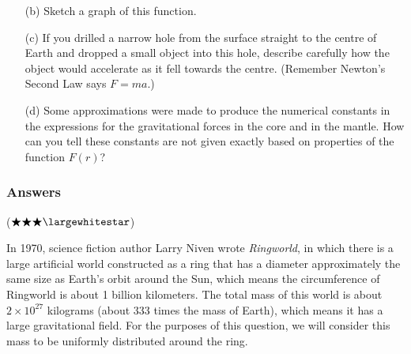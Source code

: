 \documentclass{exam}
\begin{document}
\begin{questions}
\begin{enumerate}
\item[(b)] Sketch a graph of this function.

\item[(c)] If you drilled a narrow hole from the surface straight to the centre of Earth and dropped a small object into this hole, describe carefully how the object would accelerate as it fell towards the centre. (Remember Newton's Second Law says $F=ma$.)

\item[(d)] Some approximations were made to produce the numerical constants in the expressions for the gravitational forces in the core and in the mantle. How can you tell these constants are not given exactly based on properties of the function $F(r)$?

\end{enumerate}

\color{blue}
\subsubsection*{Answers}
\color{black}

\question ($\bigstar \bigstar \bigstar \largewhitestar$) 

In 1970, science fiction author Larry Niven wrote \textit{Ringworld}, in which there is a large artificial world constructed as a ring that has a diameter approximately the same size as Earth's orbit around the Sun, which means the circumference of Ringworld is about 1 billion kilometers. The total mass of this world is about $2 \times 10^{27}$ kilograms (about 333 times the mass of Earth), which means it has a large gravitational field. For the purposes of this question, we will consider this mass to be uniformly distributed around the ring.


\end{questions}
\end{document}
